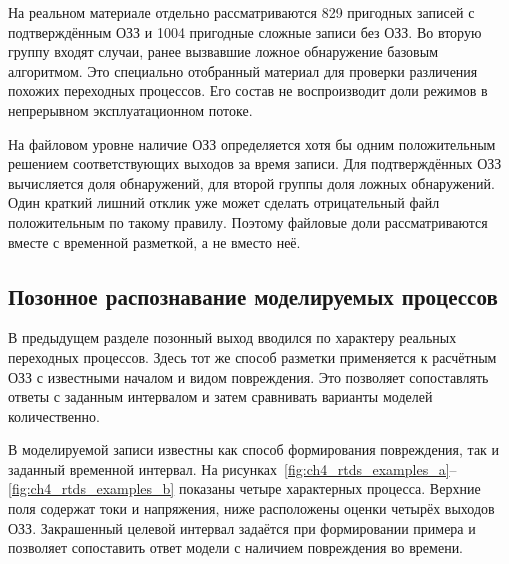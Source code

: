 {}

На реальном материале отдельно рассматриваются
829 пригодных записей с подтверждённым ОЗЗ
и 1004 пригодные сложные записи без ОЗЗ.
Во вторую группу входят случаи, ранее вызвавшие
ложное обнаружение базовым алгоритмом.
Это специально отобранный материал для проверки
различения похожих переходных процессов.
Его состав не воспроизводит доли режимов
в непрерывном эксплуатационном потоке.

На файловом уровне наличие ОЗЗ определяется
хотя бы одним положительным решением соответствующих
выходов за время записи. Для подтверждённых ОЗЗ
вычисляется доля обнаружений, для второй группы
доля ложных обнаружений.
Один краткий лишний отклик уже может сделать
отрицательный файл положительным по такому правилу.
Поэтому файловые доли рассматриваются вместе
с временной разметкой, а не вместо неё.

\subsection{Позонное распознавание моделируемых процессов}
\label{sec:ch4_rtds_examples}

В предыдущем разделе позонный выход вводился по характеру
реальных переходных процессов. Здесь тот же способ разметки
применяется к расчётным ОЗЗ с известными началом и видом
повреждения. Это позволяет сопоставлять ответы с заданным
интервалом и затем сравнивать варианты моделей количественно.

{}
В моделируемой записи известны как способ формирования
повреждения, так и заданный временной интервал.
На рисунках~\ref{fig:ch4_rtds_examples_a}--\ref{fig:ch4_rtds_examples_b}
показаны четыре характерных процесса.
Верхние поля содержат токи и напряжения,
ниже расположены оценки четырёх выходов ОЗЗ.
Закрашенный целевой интервал задаётся при формировании
примера и позволяет сопоставить ответ модели
с наличием повреждения во времени.

